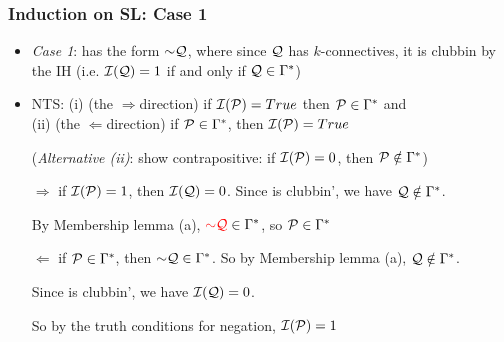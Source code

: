 \begin{frame}
\frametitle{Induction on SL: Case 1}

\begin{itemize}[<+->]

\item \emph{Case 1}:  has the form $\enot \metav{Q}$, where since $\mathcal{Q}$ has $k$-connectives, it is clubbin by the IH (i.e. $\mathcal{I}(\mathcal{Q}) = 1$ if and only if $\mathcal{Q} \in \Gamma^{\ast}$)


\item NTS: (i) (the $\Rightarrow$direction) if $\mathcal{I}(\mathcal{P}) = True$ then $\mathcal{P} \in \Gamma^{\ast}$ and \\ 
(ii) (the $\Leftarrow$direction) if $\mathcal{P} \in \Gamma^{\ast}$, then $\mathcal{I}(\mathcal{P}) = True$
\item[] (\textit{Alternative (ii)}: show contrapositive: if $\mathcal{I}(\mathcal{P}) = 0$, then $\mathcal{P} \notin \Gamma^{\ast}$)

\item[$\Rightarrow$] if $\mathcal{I}(\mathcal{P}) = 1$, then $\mathcal{I}(\mathcal{Q}) = 0$. Since  is clubbin', we have $\mathcal{Q} \notin \Gamma^{\ast}$. 
\item[] By Membership lemma (a), $\textcolor{red}{\enot \metav{Q}} \in \Gamma^{\ast}$, so $\mathcal{P} \in \Gamma^{\ast}$


\item[$\Leftarrow$] if $\mathcal{P} \in \Gamma^{\ast}$, then $\enot \metav{Q} \in \Gamma^{\ast}$. So by Membership lemma (a), $\mathcal{Q} \notin \Gamma^{\ast}$. 
\item[] Since  is clubbin', we have $\mathcal{I}(\mathcal{Q}) = 0$. \item[] So by the truth conditions for negation, $\mathcal{I}(\mathcal{P}) = 1$


\end{itemize}
\end{frame}

